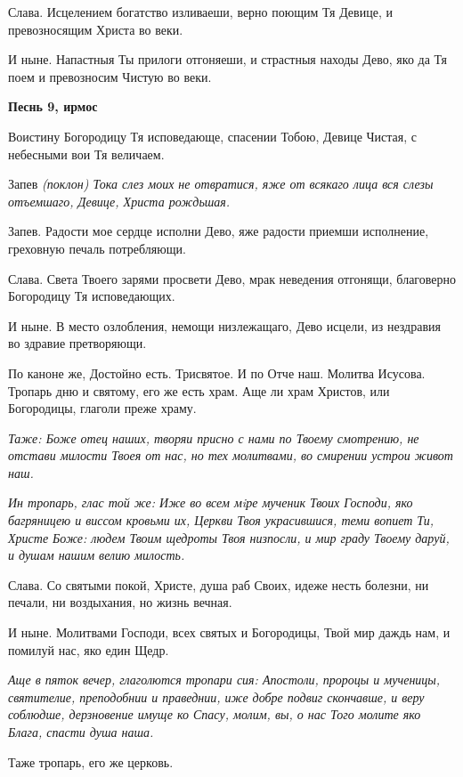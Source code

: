 Слава. Исцелением богатство изливаеши, верно поющим Тя Девице, и превозносящим Христа во веки.


И ныне. Напастныя Ты прилоги отгоняеши, и страстныя находы Дево, яко да Тя поем и превозносим Чистую во веки.





\bfseries Песнь 9, ирмос\normalfont{}


Воистину Богородицу Тя исповедающе, спасении Тобою, Девице Чистая, с небесными вои Тя величаем.


Запев \itshape (поклон)\normalfont{} Тока слез моих не отвратися, яже от всякаго лица вся слезы отъемшаго, Девице, Христа рождьшая.


Запев. Радости мое сердце исполни Дево, яже радости приемши исполнение, греховную печаль потребляющи.


Слава. Света Твоего зарями просвети Дево, мрак неведения отгонящи, благоверно Богородицу Тя исповедающих.


И ныне. В место озлобления, немощи низлежащаго, Дево исцели, из нездравия во здравие претворяющи.


По каноне же, Достойно есть. Трисвятое. И по Отче наш. Молитва Исусова. Тропарь дню и святому, его же есть храм. Аще ли храм Христов, или Богородицы, глаголи преже храму.


\itshape Таже:\normalfont{} Боже отец наших, творяи присно с нами по Твоему смотрению, не отстави милости Твоея от нас, но тех молитвами, во смирении устрои живот наш.


\itshape Ин тропарь, глас той же:\normalfont{} Иже во всем мiре мученик Твоих Господи, яко багряницею и виссом кровьми их, Церкви Твоя украсившися, теми вопиет Ти, Христе Боже: людем Твоим щедроты Твоя низпосли, и мир граду Твоему даруй, и душам нашим велию милость.


Слава. Со святыми покой, Христе, душа раб Своих, идеже несть болезни, ни печали, ни воздыхания, но жизнь вечная.


И ныне. Молитвами Господи, всех святых и Богородицы, Твой мир даждь нам, и помилуй нас, яко един Щедр.


\itshape Аще в пяток вечер, глаголются тропари сия:\normalfont{} Апостоли, пророцы и мученицы, святителие, преподобнии и праведнии, иже добре подвиг скончавше, и веру соблюдше, дерзновение имуще ко Спасу, молим, вы, о нас Того молите яко Блага, спасти душа наша.


Таже тропарь, его же церковь.


